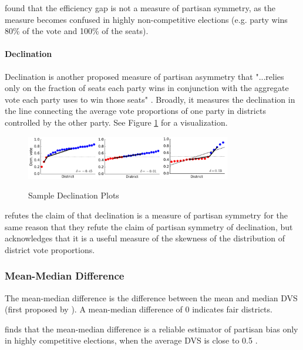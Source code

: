 \textcite{veomett2018} found that the efficiency gap is not a measure of partisan symmetry, as the measure becomes confused in highly non-competitive elections (e.g. party wins 80\% of the vote and 100\% of the seats). 

\paragraph{Declination}
\label{sec:declination}

Declination is another proposed measure of partisan asymmetry that "...relies only on the fraction of seats each party wins in conjunction with the aggregate vote each party uses to win those seats" \parencite[3]{warrington2018}. Broadly, it measures the declination in the line connecting the average vote proportions of one party in districts controlled by the other party. See Figure \ref{fig:dec} for a visualization. 

\begin{figure}[b]
    \caption{Sample Declination Plots}
    \includegraphics[width=0.8\textwidth]{img/dec.PNG}
    \label{fig:dec}
    \raggedright
\end{figure}

\textcite{katz2020} refutes the claim of \textcite{warrington2018} that declination is a measure of partisan symmetry for the same reason that they refute the claim of partisan symmetry of declination, but acknowledges that it is a useful measure of the skewness of the distribution of district vote proportions. 

\subsubsection{Mean-Median Difference}
\label{sec:meanmed}

The mean-median difference is the difference between the mean and median DVS (first proposed by \textcite{mcdonald2015}). A mean-median difference of 0 indicates fair districts. 

\textcite{katz2020} finds that the mean-median difference is a reliable estimator of partisan bias only in highly competitive elections, when the average DVS is close to 0.5 \parencite[27-9]{katz2020}.